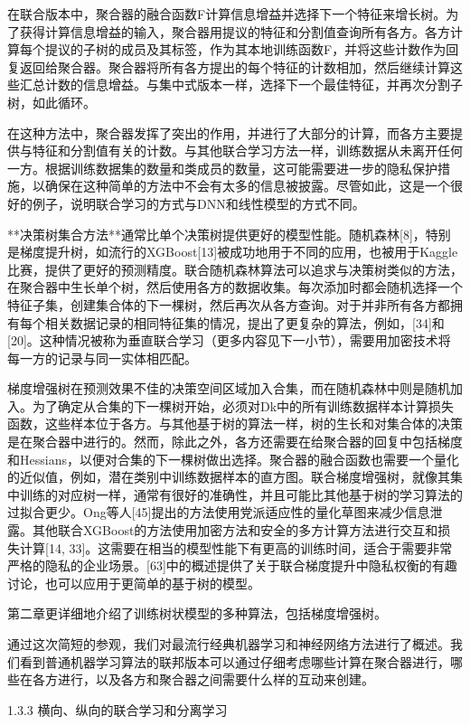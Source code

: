 在联合版本中，聚合器的融合函数F计算信息增益并选择下一个特征来增长树。为了获得计算信息增益的输入，聚合器用提议的特征和分割值查询所有各方。各方计算每个提议的子树的成员及其标签，作为其本地训练函数F，并将这些计数作为回复返回给聚合器。聚合器将所有各方提出的每个特征的计数相加，然后继续计算这些汇总计数的信息增益。与集中式版本一样，选择下一个最佳特征，并再次分割子树，如此循环。

在这种方法中，聚合器发挥了突出的作用，并进行了大部分的计算，而各方主要提供与特征和分割值有关的计数。与其他联合学习方法一样，训练数据从未离开任何一方。根据训练数据集的数量和类成员的数量，这可能需要进一步的隐私保护措施，以确保在这种简单的方法中不会有太多的信息被披露。尽管如此，这是一个很好的例子，说明联合学习的方式与DNN和线性模型的方式不同。

**决策树集合方法**通常比单个决策树提供更好的模型性能。随机森林[8]，特别是梯度提升树，如流行的XGBoost[13]被成功地用于不同的应用，也被用于Kaggle比赛，提供了更好的预测精度。联合随机森林算法可以追求与决策树类似的方法，在聚合器中生长单个树，然后使用各方的数据收集。每次添加时都会随机选择一个特征子集，创建集合体的下一棵树，然后再次从各方查询。对于并非所有各方都拥有每个相关数据记录的相同特征集的情况，提出了更复杂的算法，例如，[34]和[20]。这种情况被称为垂直联合学习（更多内容见下一小节），需要用加密技术将每一方的记录与同一实体相匹配。

梯度增强树在预测效果不佳的决策空间区域加入合集，而在随机森林中则是随机加入。为了确定从合集的下一棵树开始，必须对Dk中的所有训练数据样本计算损失函数，这些样本位于各方。与其他基于树的算法一样，树的生长和对集合体的决策是在聚合器中进行的。然而，除此之外，各方还需要在给聚合器的回复中包括梯度和Hessians，以便对合集的下一棵树做出选择。聚合器的融合函数也需要一个量化的近似值，例如，潜在类别中训练数据样本的直方图。联合梯度增强树，就像其集中训练的对应树一样，通常有很好的准确性，并且可能比其他基于树的学习算法的过拟合更少。Ong等人[45]提出的方法使用党派适应性的量化草图来减少信息泄露。其他联合XGBoost的方法使用加密方法和安全的多方计算方法进行交互和损失计算[14, 33]。这需要在相当的模型性能下有更高的训练时间，适合于需要非常严格的隐私的企业场景。[63]中的概述提供了关于联合梯度提升中隐私权衡的有趣讨论，也可以应用于更简单的基于树的模型。

第二章更详细地介绍了训练树状模型的多种算法，包括梯度增强树。

通过这次简短的参观，我们对最流行经典机器学习和神经网络方法进行了概述。我们看到普通机器学习算法的联邦版本可以通过仔细考虑哪些计算在聚合器进行，哪些在各方进行，以及各方和聚合器之间需要什么样的互动来创建。

1.3.3 横向、纵向的联合学习和分离学习

